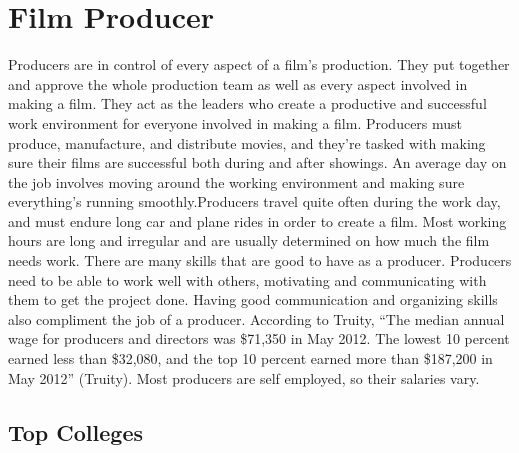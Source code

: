 \chapter{Film Producer}
\begin{multicols}{2}

Producers are in control of every aspect of a film's production. They put together and approve the whole production team as well as every aspect involved in making a film. They act as the leaders who create a productive and successful work environment for everyone involved in making a film. Producers must produce, manufacture, and distribute movies, and they’re tasked with making sure their films are successful both during and after showings. An average day on the job involves moving around the working environment and making sure everything's running smoothly.Producers travel quite often during the work day, and must endure long car and plane rides in order to create a film. Most working hours are long and irregular and are usually determined on how much the film needs work. There are many skills that are good to have as a producer. Producers need to be able to work well with others, motivating and communicating with them to get the project done. Having good communication and organizing skills also compliment the job of a producer. According to Truity, “The median annual wage for producers and directors was \$71,350 in May 2012. The lowest 10 percent earned less than \$32,080, and the top 10 percent earned more than \$187,200 in May 2012” (Truity). Most producers are self employed, so their salaries vary.

\end{multicols}

\section{Top Colleges}

\begin{table}[H]
\centering
\caption{Undergraduate Colleges}
\label{Film Producer Undergraduate Colleges}
\end{table}


